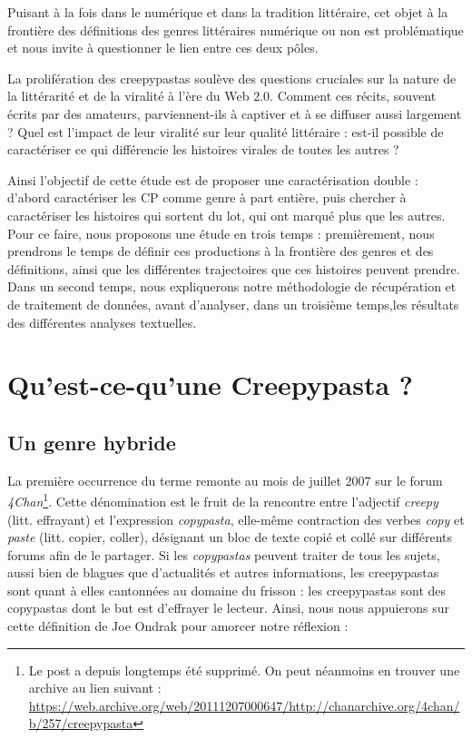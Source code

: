\documentclass[12pt,a4paper,oneside,titlepage]{book} %
\begin{document}
Puisant à la fois dans le numérique et dans la tradition littéraire, cet objet à la frontière des définitions des genres littéraires numérique ou non est problématique et nous invite à questionner le lien entre ces deux pôles.


La prolifération des creepypastas soulève des questions cruciales sur la nature de la littérarité et de la viralité à l'ère du Web 2.0. Comment ces récits, souvent écrits par des amateurs, parviennent-ils à captiver et à se diffuser aussi largement ? Quel est l'impact de leur viralité sur leur qualité littéraire : est-il possible de caractériser ce qui différencie les histoires virales de toutes les autres ? 

Ainsi l'objectif de cette étude est de proposer une caractérisation double : d'abord caractériser les CP comme genre à part entière, puis chercher à caractériser les histoires qui sortent du lot, qui ont marqué plus que les autres. 
Pour ce faire, nous proposons une étude en trois temps  : premièrement, nous prendrons le temps de définir ces productions à la frontière des genres et des définitions, ainsi que les différentes trajectoires que ces histoires peuvent prendre. Dans un second temps, nous expliquerons notre méthodologie de récupération et de traitement de données, avant d'analyser, dans un troisième temps,les résultats des différentes analyses textuelles.

	
	
\mainmatter
\part{Qu'est-ce-qu'une Creepypasta ?}

\chapter{Un genre hybride}
	\par
	La première occurrence du terme remonte au mois de juillet 2007 sur le forum \emph{4Chan}\footnote{Le post a depuis longtemps été supprimé. On peut néanmoins en trouver une archive au lien suivant : \url{https://web.archive.org/web/20111207000647/http://chanarchive.org/4chan/b/257/creepypasta}}. Cette dénomination est le fruit de la rencontre entre l'adjectif \emph{creepy} (litt. effrayant) et l'expression \emph{copypasta}, elle-même contraction des verbes \emph{copy} et \emph{paste} (litt. copier, coller), désignant un bloc de texte copié et collé sur différents forums afin de le partager. Si les \emph{copypastas} peuvent traiter de tous les sujets, aussi bien de blagues que d'actualités et autres informations, les creepypastas sont quant à elles cantonnées au domaine du frisson : les creepypastas sont des copypastas dont le but est d'effrayer le lecteur. Ainsi, nous nous appuierons sur cette définition de Joe Ondrak pour amorcer notre réflexion : 
	
\end{document}
